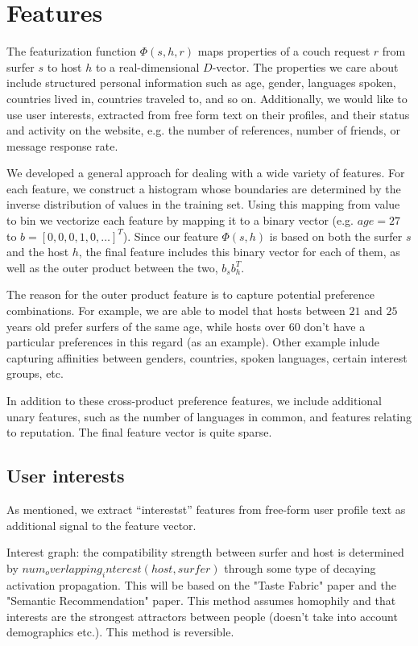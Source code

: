 \section{Features} \label{sec:features}

The featurization function $\Phi(s,h,r)$ maps properties of a couch request $r$ from surfer $s$ to host $h$ to a real-dimensional $D$-vector.
The properties we care about include structured personal information such as age, gender, languages spoken, countries lived in, countries traveled to, and so on.
Additionally, we would like to use user interests, extracted from free form text on their profiles, and their status and activity on the website, e.g. the number of references, number of friends, or message response rate.

We developed a general approach for dealing with a wide variety of features.
For each feature, we construct a histogram whose boundaries are determined by the inverse distribution of values in the training set.
Using this mapping from value to bin we vectorize each feature by mapping it to a binary vector (e.g. $age=27$ to $b=[0,0,0,1,0,\dots]^T$).
Since our feature $\Phi(s,h)$ is based on both the surfer $s$ and the host $h$, the final feature includes this binary vector for each of them, as well as the outer product between the two, $b_s b_h^T$.

The reason for the outer product feature is to capture potential preference combinations.
For example, we are able to model that hosts between $21$ and $25$ years old prefer surfers of the same age, while hosts over $60$ don't have a particular preferences in this regard (as an example).
Other example inlude capturing affinities between genders, countries, spoken languages, certain interest groups, etc.

In addition to these cross-product preference features, we include additional unary features, such as the number of languages in common, and features relating to reputation.
The final feature vector is quite sparse.

\subsection{User interests} \label{subsec:user_interests}

As mentioned, we extract ``interestst'' features from free-form user profile text as additional signal to the feature vector.

Interest graph: the compatibility strength between surfer and host is determined by $num_overlapping_interest(host, surfer)$ through some type of decaying activation propagation.  This will be based on the "Taste Fabric" paper and the "Semantic Recommendation" paper.  This method assumes homophily and that interests are the strongest attractors between people (doesn't take into account demographics etc.).  This method is reversible.

